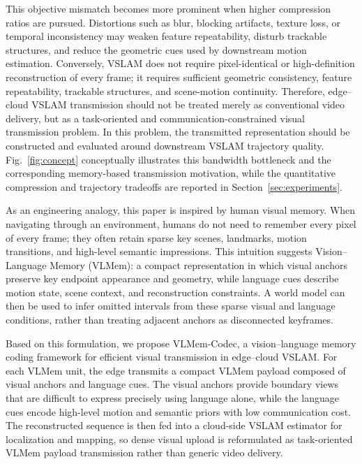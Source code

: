 \documentclass[journal]{IEEEtran}
\begin{document}
This objective mismatch becomes more prominent when higher compression ratios are pursued. Distortions such as blur, blocking artifacts, texture loss, or temporal inconsistency may weaken feature repeatability, disturb trackable structures, and reduce the geometric cues used by downstream motion estimation. Conversely, VSLAM does not require pixel-identical or high-definition reconstruction of every frame; it requires sufficient geometric consistency, feature repeatability, trackable structures, and scene-motion continuity. Therefore, edge--cloud VSLAM transmission should not be treated merely as conventional video delivery, but as a task-oriented and communication-constrained visual transmission problem. In this problem, the transmitted representation should be constructed and evaluated around downstream VSLAM trajectory quality. Fig.~\ref{fig:concept} conceptually illustrates this bandwidth bottleneck and the corresponding memory-based transmission motivation, while the quantitative compression and trajectory tradeoffs are reported in Section~\ref{sec:experiments}.

As an engineering analogy, this paper is inspired by human visual memory. When navigating through an environment, humans do not need to remember every pixel of every frame; they often retain sparse key scenes, landmarks, motion transitions, and high-level semantic impressions. This intuition suggests Vision--Language Memory (VLMem): a compact representation in which visual anchors preserve key endpoint appearance and geometry, while language cues describe motion state, scene context, and reconstruction constraints. A world model can then be used to infer omitted intervals from these sparse visual and language conditions, rather than treating adjacent anchors as disconnected keyframes.

Based on this formulation, we propose VLMem-Codec, a vision--language memory coding framework for efficient visual transmission in edge--cloud VSLAM. For each VLMem unit, the edge transmits a compact VLMem payload composed of visual anchors and language cues. The visual anchors provide boundary views that are difficult to express precisely using language alone, while the language cues encode high-level motion and semantic priors with low communication cost. The reconstructed sequence is then fed into a cloud-side VSLAM estimator for localization and mapping, so dense visual upload is reformulated as task-oriented VLMem payload transmission rather than generic video delivery.
\end{document}
